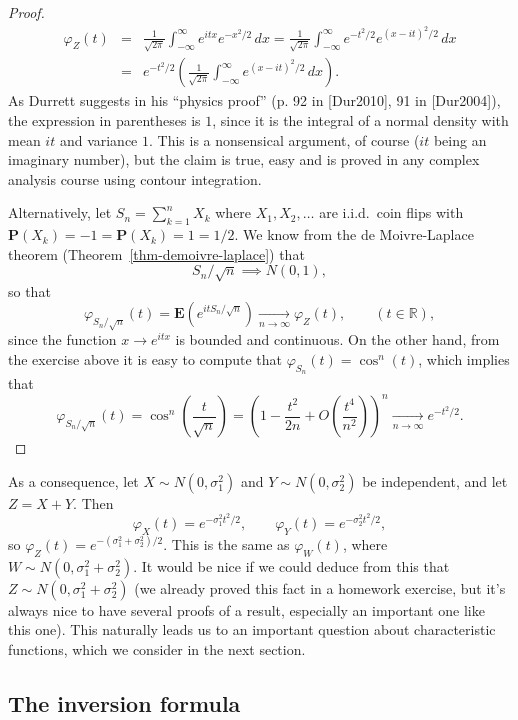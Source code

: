 \documentclass[12pt]{article}
\newcommand{\R}{\mathbb{R}}
\newcommand{\prob}{\mathbf{P}}
\newcommand{\expec}{\mathbf{E}}
\theoremstyle{example}
\begin{document}
\begin{proof} 
\begin{eqnarray*} \varphi_Z(t) &=& \frac{1}{\sqrt{2\pi}}\int_{-\infty}^\infty e^{itx} e^{-x^2/2}\,dx = \frac{1}{\sqrt{2\pi}}
\int_{-\infty}^\infty e^{-t^2/2} e^{(x-it)^2/2}\,dx \\
&=& e^{-t^2/2} \left( \frac{1}{\sqrt{2\pi}}\int_{-\infty}^\infty  e^{(x-it)^2/2}\,dx \right).
\end{eqnarray*}
As Durrett suggests in his ``physics proof'' (p. 92 in [Dur2010], 91 in [Dur2004]), the expression in parentheses is $1$, since it is the integral of a normal density with mean $it$ and variance $1$. This is a nonsensical argument, of course ($it$ being an imaginary number), but the claim is true, easy  and is proved in any complex analysis course using contour integration.

Alternatively, let $S_n=\sum_{k=1}^n X_k$ where $X_1,X_2,\ldots$ are i.i.d.\ coin flips with $\prob(X_k)=-1=\prob(X_k)=1=1/2$. We know from the de Moivre-Laplace theorem (Theorem~\ref{thm-demoivre-laplace}) that
$$ S_n/\sqrt{n} \implies N(0,1), $$
so that
$$ \varphi_{S_n/\sqrt{n}}(t) = \expec\left( e^{it S_n/\sqrt{n}} \right) \xrightarrow[n\to\infty]{} \varphi_Z(t),
\qquad (t\in\R),$$
since the function $x\to e^{i t x}$ is bounded and continuous. On the other hand, from the exercise above it is easy to compute that $\varphi_{S_n}(t) = \cos^n(t)$, which implies that
$$ \varphi_{S_n/\sqrt{n}}(t) = \cos^n\left(\frac{t}{\sqrt{n}}\right)= \left(1-\frac{t^2}{2n} + O\left(\frac{t^4}{n^2}\right)\right)^n \xrightarrow[n\to\infty]{} e^{-t^2/2}. $$
\end{proof}

As a consequence, let $X\sim N(0,\sigma_1^2)$ and $Y\sim N(0,\sigma_2^2)$ be independent, and let $Z=X+Y$. Then
$$ \varphi_X(t) = e^{-\sigma_1^2 t^2/2}, \qquad \varphi_Y(t) = e^{-\sigma_2^2 t^2/2}, $$
so $ \varphi_Z(t) = e^{-(\sigma_1^2+\sigma_2^2)/2}$. This is the same as $\varphi_W(t)$, where $W\sim N(0,\sigma_1^2+\sigma_2^2)$. It would be nice if we could deduce from this that $Z \sim N(0,\sigma_1^2+\sigma_2^2)$ (we already proved this fact in a homework exercise, but it's always nice to have several proofs of a result, especially an important one like this one). This naturally leads us to an important question about characteristic functions, which we consider in the next section.

\subsection{The inversion formula}
\end{document}
